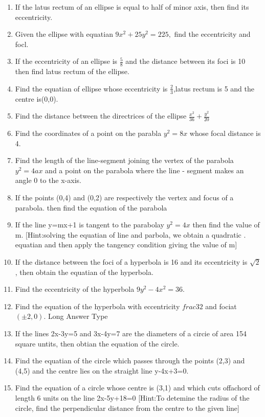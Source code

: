 \documentclass[12pt]{article}
\begin{document}
\begin{enumerate}
 [Hint:cancentric circles have the same [entre.]
 \item If the latus rectum of an ellipse is equal to half of minor axis, then find its eccentricity.
 \item Given the ellipse with equatian $9x^2+25y^2=225,$ find the eccentricity and focl.
 \item If the eccentricity of an ellipse is $\frac{5}{8}$ and  the distance between its foci is 10 then find latus rectum of the ellipse.
 \item Find the equatian of ellipse whose eccentricity is $\frac{2}{3}$,latus rectum is 5 and the centre is(0,0).
 \item Find the distance between the directrices of the ellipse $\frac{x^2}{36}+\frac{y^2}{20}$
 \item Find the coordinates of a point on the parabla $y^2=8x$ whose focal distance is 4.
 \item Find the length of the line-segment joining the vertex of the parabola $y^2=4ax$ and a point on the parabola where the line - segment makes an angle 0 to the x-axis.
\item If the points (0,4) and (0,2) are respectively the vertex and focus of a parabola. then find the equation of the parabola
\item If the line y=mx+1 is tangent to the parabolay $y^2=4x$ then find the value of m.
[Hint:solving the equatian of line  and parbola, we obtain a quadratic . equatian and then apply the tangency condition giving the value of m]
\item If the distance between the foci of a hyperbola is 16 and its eccentricity is $\sqrt{2}$, then obtain the equatian of the hyperbola.
\item Find the eccentricity of the hyperbola $9y^2-4x^2=36$.
\item Find the equation of the hyperbola with eccentricity $frac{3}{2}$ and fociat $(\pm2,0)$.
Long Answer Type 
\item If the lines 2x-3y=5 and 3x-4y=7 are the diameters of a circie of area 154 square untits, then obtian the equation of the circle.
\item Find the equatian of the circle which passes through the points (2,3) and (4,5) and the centre lies on the straight line y-4x+3=0.
\item Find the equation of a circle whose centre is (3,1) and which cuts offachord of length  6 units on the  line 2x-5y+18=0
[Hint:To detemine the radius of the circle, find the perpendicular distance from the centre to the given line]

\end{enumerate}
\end{document}
